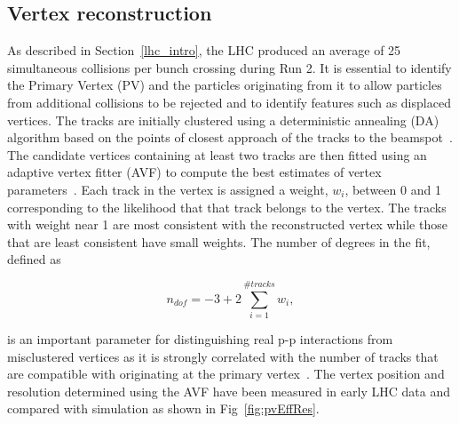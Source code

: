 \subsection{Vertex reconstruction}

As described in Section~\ref{lhc_intro}, the LHC produced an average of 25 simultaneous collisions per bunch crossing
during Run 2. It is essential to identify the Primary Vertex (PV) and the particles originating from it to allow 
particles from additional collisions to be rejected and to identify features such as displaced vertices. The tracks
are initially clustered using a deterministic annealing (DA) algorithm based on the points of closest approach of the 
tracks to the beamspot~\cite{tracker_vertex}. The candidate vertices containing at least two tracks are then
fitted using an adaptive vertex fitter (AVF) to compute the best estimates of vertex parameters~\cite{tracker_avf}. 
Each track in the vertex is assigned a weight, $w_i$, between 0 and 1 corresponding to the likelihood that that track
belongs to the vertex. The tracks with weight near 1 are most consistent with the reconstructed vertex while
those that are least consistent have small weights. The number of degrees in the fit, defined as 

\begin{equation}
n_{dof} = -3 + 2 \sum_{i=1}^{\#tracks} w_{i},
\end{equation}

\noindent is an important parameter for distinguishing real p-p interactions from misclustered vertices 
as it is strongly correlated with the number of tracks that are compatible 
with originating at the primary vertex~\cite{tracker_vertex}. The vertex
position and resolution determined using the AVF have been 
measured in early LHC data and compared with simulation as shown in Fig~\ref{fig:pvEffRes}.

